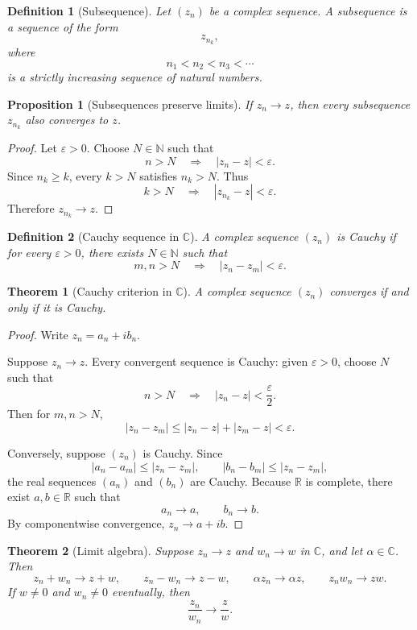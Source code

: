 \documentclass[11pt]{article}
\newtheorem{definition}{Definition}[section]
\newtheorem{proposition}{Proposition}[section]
\newtheorem{theorem}{Theorem}[section]
\newcommand{\C}{\mathbb{C}}
\newcommand{\R}{\mathbb{R}}
\newcommand{\N}{\mathbb{N}}
\newcommand{\abs}[1]{\left|#1\right|}
\begin{document}
\begin{definition}[Subsequence]
Let $(z_{n})$ be a complex sequence.
A subsequence is a sequence of the form
\[
  z_{n_{k}},
\]
where
\[
  n_{1}<n_{2}<n_{3}<\cdots
\]
is a strictly increasing sequence of natural numbers.
\end{definition}

\begin{proposition}[Subsequences preserve limits]
If $z_{n}\to z$, then every subsequence $z_{n_{k}}$ also converges to $z$.
\end{proposition}

\begin{proof}
Let $\varepsilon>0$.
Choose $N\in\N$ such that
\[
  n>N\quad\Longrightarrow\quad \abs{z_{n}-z}<\varepsilon.
\]
Since $n_{k}\ge k$, every $k>N$ satisfies $n_{k}>N$.
Thus
\[
  k>N\quad\Longrightarrow\quad \abs{z_{n_{k}}-z}<\varepsilon.
\]
Therefore $z_{n_{k}}\to z$.
\end{proof}

\begin{definition}[Cauchy sequence in $\C$]
A complex sequence $(z_{n})$ is Cauchy if for every $\varepsilon>0$, there exists $N\in\N$ such that
\[
  m,n>N\quad\Longrightarrow\quad \abs{z_{n}-z_{m}}<\varepsilon.
\]
\end{definition}

\begin{theorem}[Cauchy criterion in $\C$]
A complex sequence $(z_{n})$ converges if and only if it is Cauchy.
\end{theorem}

\begin{proof}
Write $z_{n}=a_{n}+ib_{n}$.

Suppose $z_{n}\to z$.
Every convergent sequence is Cauchy: given $\varepsilon>0$, choose $N$ such that
\[
  n>N\quad\Longrightarrow\quad \abs{z_{n}-z}<\frac{\varepsilon}{2}.
\]
Then for $m,n>N$,
\[
  \abs{z_{n}-z_{m}}
  \le \abs{z_{n}-z}+\abs{z_{m}-z}
  <\varepsilon.
\]

Conversely, suppose $(z_{n})$ is Cauchy.
Since
\[
  \abs{a_{n}-a_{m}}\le \abs{z_{n}-z_{m}},
  \qquad
  \abs{b_{n}-b_{m}}\le \abs{z_{n}-z_{m}},
\]
the real sequences $(a_{n})$ and $(b_{n})$ are Cauchy.
Because $\R$ is complete, there exist $a,b\in\R$ such that
\[
  a_{n}\to a,
  \qquad
  b_{n}\to b.
\]
By componentwise convergence, $z_{n}\to a+ib$.
\end{proof}

\begin{theorem}[Limit algebra]
Suppose $z_{n}\to z$ and $w_{n}\to w$ in $\C$, and let $\alpha\in\C$.
Then
\[
  z_{n}+w_{n}\to z+w,
  \qquad
  z_{n}-w_{n}\to z-w,
  \qquad
  \alpha z_{n}\to \alpha z,
  \qquad
  z_{n}w_{n}\to zw.
\]
If $w\ne0$ and $w_{n}\ne0$ eventually, then
\[
  \frac{z_{n}}{w_{n}}\to\frac{z}{w}.
\]
\end{theorem}
\end{document}
